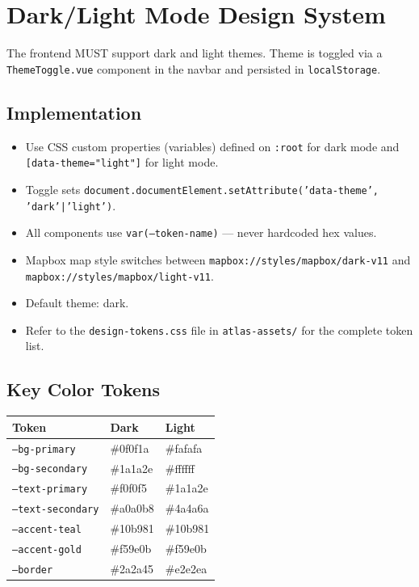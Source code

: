 \documentclass[12pt,letterpaper]{article}
\begin{document}
\newpage

\section{Dark/Light Mode Design System}

The frontend MUST support dark and light themes. Theme is toggled via a \texttt{ThemeToggle.vue} component in the navbar and persisted in \texttt{localStorage}.

\subsection{Implementation}
\begin{itemize}
  \item Use CSS custom properties (variables) defined on \texttt{:root} for dark mode and \texttt{[data-theme="light"]} for light mode.
  \item Toggle sets \texttt{document.documentElement.setAttribute('data-theme', 'dark'|'light')}.
  \item All components use \texttt{var(--token-name)} --- never hardcoded hex values.
  \item Mapbox map style switches between \texttt{mapbox://styles/mapbox/dark-v11} and \texttt{mapbox://styles/mapbox/light-v11}.
  \item Default theme: dark.
  \item Refer to the \texttt{design-tokens.css} file in \texttt{atlas-assets/} for the complete token list.
\end{itemize}

\subsection{Key Color Tokens}
\begin{tabular}{|l|l|l|}
\hline
\textbf{Token} & \textbf{Dark} & \textbf{Light} \\
\hline
\texttt{--bg-primary} & \#0f0f1a & \#fafafa \\
\texttt{--bg-secondary} & \#1a1a2e & \#ffffff \\
\texttt{--text-primary} & \#f0f0f5 & \#1a1a2e \\
\texttt{--text-secondary} & \#a0a0b8 & \#4a4a6a \\
\texttt{--accent-teal} & \#10b981 & \#10b981 \\
\texttt{--accent-gold} & \#f59e0b & \#f59e0b \\
\texttt{--border} & \#2a2a45 & \#e2e2ea \\
\hline
\end{tabular}
\end{document}
